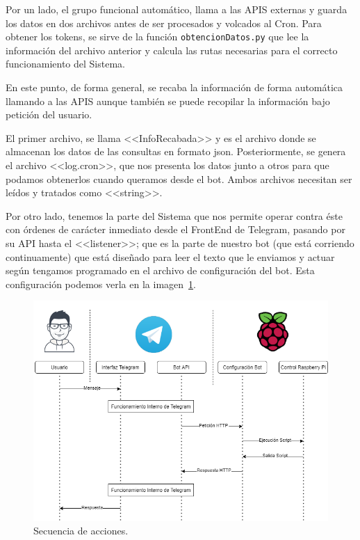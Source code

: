 Por un lado, el grupo funcional automático, llama a las APIS externas y guarda los datos en dos archivos antes de ser procesados y volcados al Cron. Para obtener los tokens, se sirve de la función \texttt{obtencionDatos.py} que lee la información del archivo anterior y calcula las rutas necesarias para el correcto funcionamiento del Sistema.

En este punto, de forma general, se recaba la información de forma automática llamando a las APIS aunque también se puede recopilar la información bajo petición del usuario.

El primer archivo, se llama <<InfoRecabada>> y es el archivo donde se almacenan los datos de las consultas en formato json. Posteriormente, se genera el archivo <<log.cron>>, que nos presenta los datos junto a otros para que podamos obtenerlos cuando queramos desde el bot. Ambos archivos necesitan ser leídos y tratados como <<string>>.

Por otro lado, tenemos la parte del Sistema que nos permite operar contra éste con órdenes de carácter inmediato desde el FrontEnd de Telegram, pasando por su API hasta el <<listener>>; que es la parte de nuestro bot (que está corriendo continuamente) que está diseñado para leer el texto que le enviamos y actuar según tengamos programado en el archivo de configuración del bot. Esta configuración podemos verla en la imagen~\ref{SecuenciaAcciones}. 

\begin{figure}[h]
\includegraphics[width=1.15\textwidth]{img/Diagramas/FuncionamientoBot.png}
\caption{Secuencia de acciones.}\label{SecuenciaAcciones}
\end{figure}

